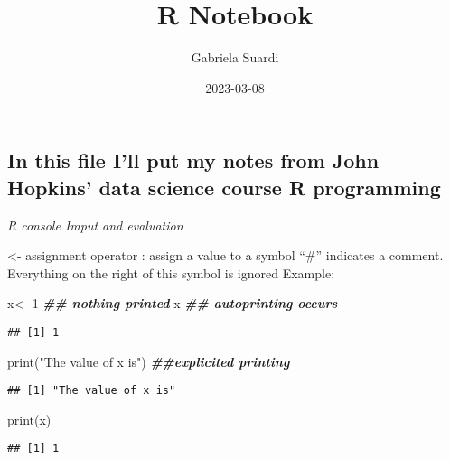 \documentclass[
]{article}
\title{R Notebook}
\author{Gabriela Suardi}
\date{2023-03-08}
\newenvironment{Shaded}{\begin{snugshade}}{\end{snugshade}}
\newcommand{\DecValTok}[1]{\textcolor[rgb]{0.00,0.00,0.81}{#1}}
\newcommand{\DocumentationTok}[1]{\textcolor[rgb]{0.56,0.35,0.01}{\textbf{\textit{#1}}}}
\newcommand{\FunctionTok}[1]{\textcolor[rgb]{0.00,0.00,0.00}{#1}}
\newcommand{\NormalTok}[1]{#1}
\newcommand{\OtherTok}[1]{\textcolor[rgb]{0.56,0.35,0.01}{#1}}
\newcommand{\StringTok}[1]{\textcolor[rgb]{0.31,0.60,0.02}{#1}}
\begin{document}
\maketitle

\hypertarget{in-this-file-ill-put-my-notes-from-john-hopkins-data-science-course-r-programming}{%
\subsection{In this file I'll put my notes from John Hopkins' data
science course R
programming}\label{in-this-file-ill-put-my-notes-from-john-hopkins-data-science-course-r-programming}}

\emph{R console Imput and evaluation}

\textless- assignment operator : assign a value to a symbol ``\#''
indicates a comment. Everything on the right of this symbol is ignored
Example:

\begin{Shaded}
\begin{Highlighting}[]
\NormalTok{x}\OtherTok{\textless{}{-}} \DecValTok{1}     \DocumentationTok{\#\# nothing printed}
\NormalTok{x         }\DocumentationTok{\#\# autoprinting occurs}
\end{Highlighting}
\end{Shaded}

\begin{verbatim}
## [1] 1
\end{verbatim}

\begin{Shaded}
\begin{Highlighting}[]
\FunctionTok{print}\NormalTok{(}\StringTok{"The value of x is"}\NormalTok{)     }\DocumentationTok{\#\#explicited printing}
\end{Highlighting}
\end{Shaded}

\begin{verbatim}
## [1] "The value of x is"
\end{verbatim}

\begin{Shaded}
\begin{Highlighting}[]
\FunctionTok{print}\NormalTok{(x)}
\end{Highlighting}
\end{Shaded}

\begin{verbatim}
## [1] 1
\end{verbatim}
\end{document}
